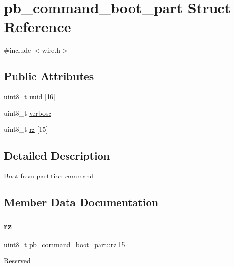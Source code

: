 \hypertarget{structpb__command__boot__part}{}\section{pb\+\_\+command\+\_\+boot\+\_\+part Struct Reference}
\label{structpb__command__boot__part}


{\ttfamily \#include $<$wire.\+h$>$}

\subsection*{Public Attributes}
\begin{DoxyCompactItemize}
\item 
uint8\+\_\+t \hyperlink{structpb__command__boot__part_ad14c4b46462741aeffdf774d84e62ad9}{uuid} \mbox{[}16\mbox{]}
\item 
uint8\+\_\+t \hyperlink{structpb__command__boot__part_abe5ac22da3fcb1fc93a8890a8e6862b4}{verbose}
\item 
uint8\+\_\+t \hyperlink{structpb__command__boot__part_ab2a06e190bd04a3c37c53e48bb496b7a}{rz} \mbox{[}15\mbox{]}
\end{DoxyCompactItemize}


\subsection{Detailed Description}
Boot from partition command 

\subsection{Member Data Documentation}
\mbox{\label{structpb__command__boot__part_ab2a06e190bd04a3c37c53e48bb496b7a}} 
\subsubsection{\texorpdfstring{rz}{rz}}
{\footnotesize\ttfamily uint8\+\_\+t pb\+\_\+command\+\_\+boot\+\_\+part\+::rz\mbox{[}15\mbox{]}}

Reserved \mbox{\label{structpb__command__boot__part_ad14c4b46462741aeffdf774d84e62ad9}} 
